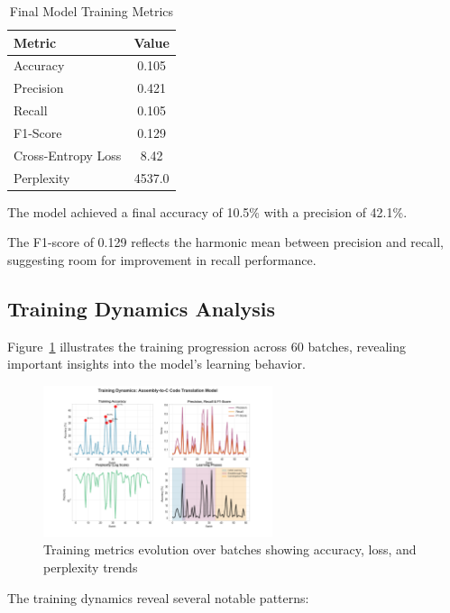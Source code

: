\documentclass[../main.tex]{subfiles}
\begin{document}
\begin{table}[htbp]
\centering
\caption{Final Model Training Metrics}
\label{tab:training_metrics}
\begin{tabular}{lc}
\toprule
\textbf{Metric} & \textbf{Value} \\
\midrule
Accuracy & 0.105 \\
Precision & 0.421 \\
Recall & 0.105 \\
F1-Score & 0.129 \\
Cross-Entropy Loss & 8.42 \\
Perplexity & 4537.0 \\
\bottomrule
\end{tabular}
\end{table}

The model achieved a final accuracy of 10.5\% with a precision of 42.1\%. 

The F1-score of 0.129 reflects the harmonic mean between precision and recall, suggesting room for improvement in recall performance.

\subsection{Training Dynamics Analysis}

Figure~\ref{fig:images/training_curves.png} illustrates the training progression across 60 batches, revealing important insights into the model's learning behavior.

\begin{figure}[htbp]
\centering
\includegraphics[width=0.6\textwidth]{images/training_curves.png}
\caption{Training metrics evolution over batches showing accuracy, loss, and perplexity trends}
\label{fig:images/training_curves.png}
\end{figure}

The training dynamics reveal several notable patterns:
\end{document}
